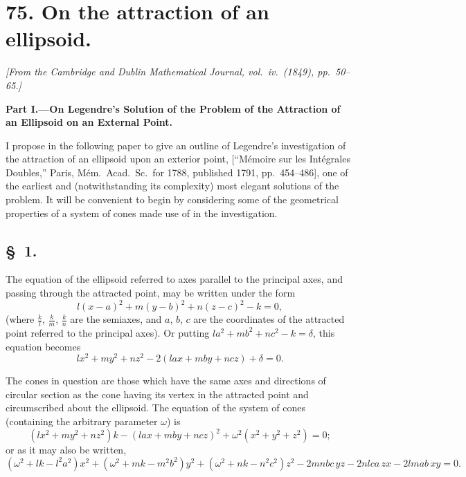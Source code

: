 \documentclass[11pt,a4paper]{book}
\begin{document}
\newpage
\section*{75. On the attraction of an ellipsoid.}

\begin{flushright}
\textit{[From the Cambridge and Dublin Mathematical Journal, vol.\ iv.\ (1849), pp.\ 50--65.]}
\end{flushright}

\setcounter{page}{432}

\begin{center}
\textbf{Part I.---On Legendre's Solution of the Problem of the Attraction of an Ellipsoid on an External Point.}
\end{center}

\textsc{I} propose in the following paper to give an outline of Legendre's investigation of the attraction of an ellipsoid upon an exterior point, [``M\'{e}moire sur les Int\'{e}grales Doubles,'' Paris, M\'{e}m.\ Acad.\ Sc.\ for 1788, published 1791, pp.~454--486], one of the earliest and (notwithstanding its complexity) most elegant solutions of the problem. It will be convenient to begin by considering some of the geometrical properties of a system of cones made use of in the investigation.

\subsection*{\S~1.}

The equation of the ellipsoid referred to axes parallel to the principal axes, and passing through the attracted point, may be written under the form
\[
l(x-a)^{2} + m(y-b)^{2} + n(z-c)^{2} - k = 0,
\]
(where $\frac{k}{l}$, $\frac{k}{m}$, $\frac{k}{n}$ are the semiaxes, and $a$, $b$, $c$ are the coordinates of the attracted point referred to the principal axes). Or putting $la^{2} + mb^{2} + nc^{2} - k = \delta$, this equation becomes
\[
lx^{2} + my^{2} + nz^{2} - 2(lax + mby + ncz) + \delta = 0.
\]

The cones in question are those which have the same axes and directions of circular section as the cone having its vertex in the attracted point and circumscribed about the ellipsoid. The equation of the system of cones (containing the arbitrary parameter $\omega$) is
\[
(lx^{2} + my^{2} + nz^{2})k - (lax + mby + ncz)^{2} + \omega^{2}(x^{2} + y^{2} + z^{2}) = 0;
\]
or as it may also be written,
\[
(\omega^{2} + lk - l^{2}a^{2})x^{2} + (\omega^{2} + mk - m^{2}b^{2})y^{2} + (\omega^{2} + nk - n^{2}c^{2})z^{2} - 2mnbc\,yz - 2nlca\,zx - 2lmab\,xy = 0.
\]
\end{document}
